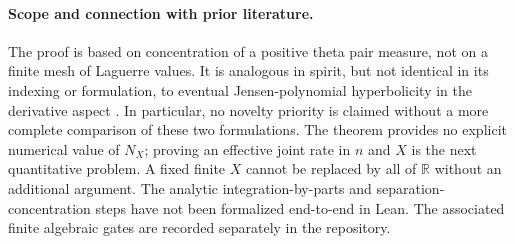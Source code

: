 \paragraph{Scope and connection with prior literature.}
The proof is based on concentration of
a positive theta pair measure, not on a
finite mesh of Laguerre values. It is
analogous in spirit, but not identical
in its indexing or formulation, to
eventual Jensen-polynomial hyperbolicity
in the derivative aspect
\cite{GORZ,JensenXi}.
In particular, no novelty priority is claimed
without a more complete comparison of
these two formulations.
The theorem provides no explicit numerical
value of $N_X$; proving an effective
joint rate in $n$ and $X$ is the next
quantitative problem. A fixed finite $X$
cannot be replaced by all of $\mathbb R$
without an additional argument.
The analytic integration-by-parts and
separation-concentration steps have not
been formalized end-to-end in Lean.
The associated finite algebraic gates are
recorded separately in the repository.
